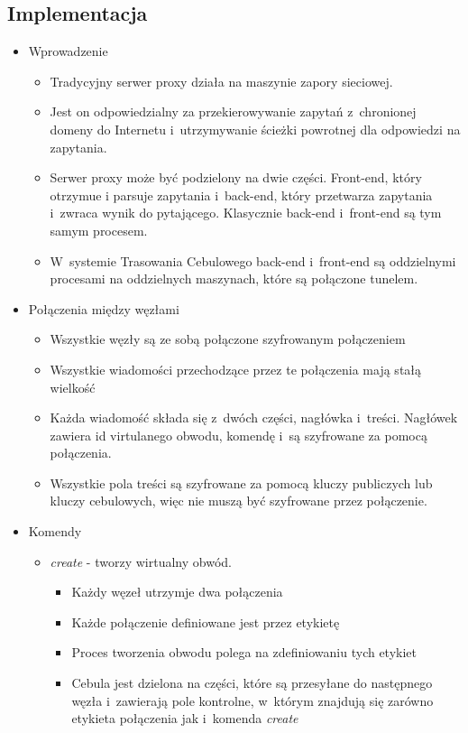         \subsection{Implementacja}
	\begin{itemize}
	  \item Wprowadzenie
	  \begin{itemize}
	  \item Tradycyjny serwer proxy działa na maszynie zapory sieciowej.
	  \item Jest on odpowiedzialny za przekierowywanie zapytań z~chronionej domeny do Internetu i~utrzymywanie ścieżki powrotnej dla odpowiedzi na zapytania.
	  \item Serwer proxy może być podzielony na dwie części. Front-end, który otrzymue i parsuje zapytania i~back-end, który przetwarza zapytania i~zwraca wynik do pytającego. Klasycznie back-end i~front-end są tym samym procesem.
	  \item W~systemie Trasowania Cebulowego back-end i~front-end są oddzielnymi procesami na oddzielnych maszynach, które są połączone tunelem.
	  \end{itemize}
	  \item Połączenia między węzłami
	  \begin{itemize}
	   \item Wszystkie węzły są ze sobą połączone szyfrowanym połączeniem
	   \item Wszystkie wiadomości przechodzące przez te połączenia mają stałą wielkość
	   \item Każda wiadomość składa się z~dwóch części, nagłówka i~treści. Nagłówek zawiera id virtulanego obwodu, komendę i~są szyfrowane za pomocą połączenia. 
	   \item Wszystkie pola treści są szyfrowane za pomocą kluczy publiczych lub kluczy cebulowych, więc nie muszą być szyfrowane przez połączenie.
	  \end{itemize}
	  \item Komendy
	  \begin{itemize}
	   \item \textit{create} - tworzy wirtualny obwód.
	   \begin{itemize}
	    \item Każdy węzeł utrzymje dwa połączenia
	    \item Każde połączenie definiowane jest przez etykietę
	    \item Proces tworzenia obwodu polega na zdefiniowaniu tych etykiet
	    \item Cebula jest dzielona na części, które są przesyłane do następnego węzła i~zawierają pole kontrolne, w~którym znajdują się zarówno etykieta połączenia jak i~komenda \textit{create}

\end{itemize}
\end{itemize}
\end{itemize}
